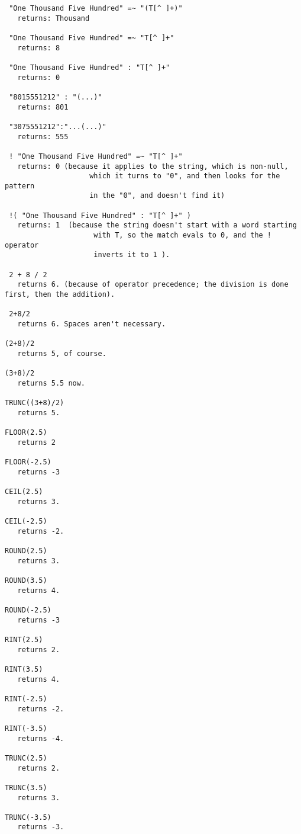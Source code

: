 \begin{astlisting}
\begin{verbatim}
 "One Thousand Five Hundred" =~ "(T[^ ]+)"
   returns: Thousand

 "One Thousand Five Hundred" =~ "T[^ ]+"
   returns: 8

 "One Thousand Five Hundred" : "T[^ ]+"
   returns: 0

 "8015551212" : "(...)"
   returns: 801

 "3075551212":"...(...)"
   returns: 555

 ! "One Thousand Five Hundred" =~ "T[^ ]+"
   returns: 0 (because it applies to the string, which is non-null,
                    which it turns to "0", and then looks for the pattern
                    in the "0", and doesn't find it)

 !( "One Thousand Five Hundred" : "T[^ ]+" )
   returns: 1  (because the string doesn't start with a word starting
                     with T, so the match evals to 0, and the ! operator
                     inverts it to 1 ).

 2 + 8 / 2
   returns 6. (because of operator precedence; the division is done first, then the addition).

 2+8/2
   returns 6. Spaces aren't necessary.

(2+8)/2
   returns 5, of course.

(3+8)/2
   returns 5.5 now.

TRUNC((3+8)/2)
   returns 5.

FLOOR(2.5)
   returns 2

FLOOR(-2.5)
   returns -3

CEIL(2.5)
   returns 3.

CEIL(-2.5)
   returns -2.

ROUND(2.5)
   returns 3.

ROUND(3.5)
   returns 4.

ROUND(-2.5)
   returns -3

RINT(2.5)
   returns 2.

RINT(3.5)
   returns 4.

RINT(-2.5)
   returns -2.

RINT(-3.5)
   returns -4.

TRUNC(2.5)
   returns 2.

TRUNC(3.5)
   returns 3.

TRUNC(-3.5)
   returns -3.
\end{verbatim}
\end{astlisting}

